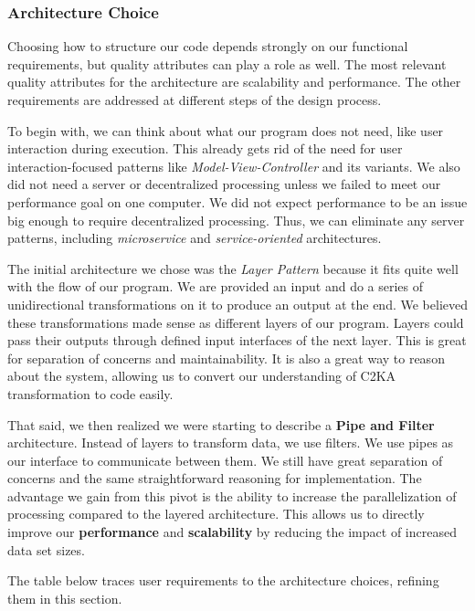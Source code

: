 \subsubsection{Architecture Choice}
Choosing how to structure our code depends strongly on our functional requirements,
but quality attributes can play a role as well.
The most relevant quality attributes for the architecture are scalability and performance.
The other requirements are addressed at different steps of the design process.

To begin with, we can think about what our program does not need, like user interaction during execution.
This already gets rid of the need for user interaction-focused patterns like \textit{Model-View-Controller} and its variants.
We also did not need a server or decentralized processing unless we failed to meet our performance goal on one computer.
We did not expect performance to be an issue big enough to require decentralized processing.
Thus, we can eliminate any server patterns, including \textit{microservice} and \textit{service-oriented} architectures.

The initial architecture we chose was the \textit{Layer Pattern} because it fits quite well with the flow of our program.
We are provided an input and do a series of unidirectional transformations on it to produce an output at the end.
We believed these transformations made sense as different layers of our program.
Layers could pass their outputs through defined input interfaces of the next layer.
This is great for separation of concerns and maintainability.
It is also a great way to reason about the system, allowing us to convert our understanding of C2KA transformation to code easily.

That said, we then realized we were starting to describe a \textbf{Pipe and Filter} architecture.
Instead of layers to transform data, we use filters.
We use pipes as our interface to communicate between them.
We still have great separation of concerns and the same straightforward reasoning for implementation.
The advantage we gain from this pivot is the ability to increase the parallelization of processing compared to the layered architecture.
This allows us to directly improve our \textbf{performance} and \textbf{scalability} by reducing the impact of increased data set sizes.

The table below traces user requirements to the architecture choices, refining them in this section.

